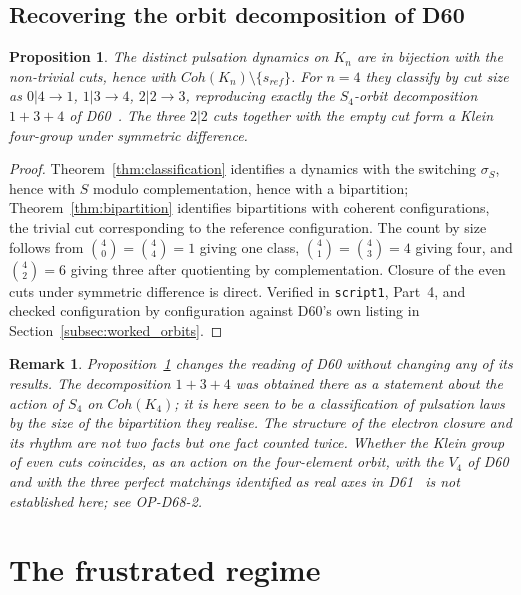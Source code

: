 \documentclass[11pt,a4paper]{article}
\def\mathrm#1{#1}%
\newtheorem{proposition}[theorem]{Proposition}
\newtheorem{remark}[theorem]{Remark}
\newcommand{\Kfour}{K_4}
\newcommand{\Kn}{K_n}
\newcommand{\Coh}{\mathrm{Coh}}
\begin{document}
\subsection{Recovering the orbit decomposition of D60}

\begin{proposition}
\label{prop:orbits}
The distinct pulsation dynamics on $\Kn$ are in bijection with the non-trivial cuts, hence with $\Coh(\Kn)\setminus\{s_{\mathrm{ref}}\}$. For $n=4$ they classify by cut size as $0|4\to1$, $1|3\to4$, $2|2\to3$, reproducing exactly the $S_4$-orbit decomposition $1+3+4$ of D60~\citep{D60}. The three $2|2$ cuts together with the empty cut form a Klein four-group under symmetric difference.
\end{proposition}

\begin{proof}
Theorem~\ref{thm:classification} identifies a dynamics with the switching $\sigma_S$, hence with $S$ modulo complementation, hence with a bipartition; Theorem~\ref{thm:bipartition} identifies bipartitions with coherent configurations, the trivial cut corresponding to the reference configuration. The count by size follows from $\binom{4}{0}=\binom{4}{4}=1$ giving one class, $\binom{4}{1}=\binom{4}{3}=4$ giving four, and $\binom{4}{2}=6$ giving three after quotienting by complementation. Closure of the even cuts under symmetric difference is direct. Verified in \texttt{script1}, Part~4, and checked configuration by configuration against D60's own listing in Section~\ref{subsec:worked_orbits}.
\end{proof}

\begin{remark}
Proposition~\ref{prop:orbits} changes the reading of D60 without changing any of its results. The decomposition $1+3+4$ was obtained there as a statement about the action of $S_4$ on $\Coh(\Kfour)$; it is here seen to be a classification of \emph{pulsation laws} by the size of the bipartition they realise. The structure of the electron closure and its rhythm are not two facts but one fact counted twice. Whether the Klein group of even cuts coincides, as an action on the four-element orbit, with the $V_4$ of D60 and with the three perfect matchings identified as real axes in D61~\citep{D61} is not established here; see OP-D68-2.
\end{remark}

\section{The frustrated regime}
\label{sec:frustration}
\end{document}
